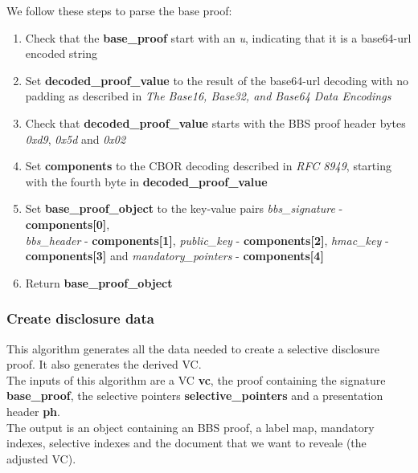 \documentclass[
	a4paper               %
	,BCOR=0mm            %
	,bibliography=totoc   %
	,listof=totoc         %
	,monolingual
	,twoside=false
]{bfhthesis}              %
\begin{document}
We follow these steps to parse the base proof:
\begin{enumerate}
	\item Check that the \textbf{base\_proof} start with an \textit{u}, indicating that it is a base64-url encoded string
	\item Set \textbf{decoded\_proof\_value} to the result of the base64-url decoding with no padding as described in \textit{The Base16, Base32, and Base64 Data Encodings}\cite{base64}
	\item Check that \textbf{decoded\_proof\_value} starts with the BBS proof header bytes \textit{0xd9}, \textit{0x5d} and \textit{0x02}
	\item Set \textbf{components} to the CBOR decoding described in \textit{RFC 8949}\cite{cbor}, starting with the fourth byte in \textbf{decoded\_proof\_value}
	\item Set \textbf{base\_proof\_object} to the key-value pairs \textit{bbs\_signature} - \textbf{components[0]}, \\\textit{bbs\_header} - \textbf{components[1]}, \textit{public\_key} - \textbf{components[2]}, \textit{hmac\_key} - \textbf{components[3]} and \textit{mandatory\_pointers} - \textbf{components[4]}
	\item Return \textbf{base\_proof\_object}
\end{enumerate}

\subsubsection{Create disclosure data}
\label{subsub:createdisclosuredata}
This algorithm generates all the data needed to create a selective disclosure proof. It also generates the derived VC.\\

The inputs of this algorithm are a VC \textbf{vc}, the proof containing the signature \textbf{base\_proof}, the selective pointers \textbf{selective\_pointers} and a presentation header \textbf{ph}.\\

The output is an object containing an BBS proof, a label map, mandatory indexes, selective indexes and the document that we want to reveale (the adjusted VC).\\
\end{document}
